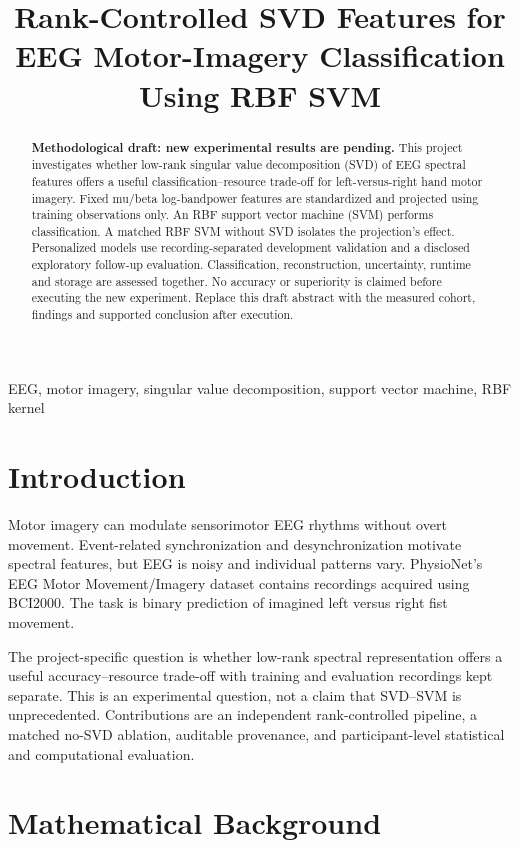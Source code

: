 \documentclass[conference]{IEEEtran}
\title{Rank-Controlled SVD Features for EEG Motor-Imagery Classification Using RBF SVM}
\author{\IEEEauthorblockN{[Student names and USNs]}
\IEEEauthorblockA{[Department and institution]\\Faculty: Dr Geetha KN\\{[Academic year]}}}
\begin{document}
\maketitle
\begin{abstract}
\textbf{Methodological draft: new experimental results are pending.}
This project investigates whether low-rank singular value decomposition (SVD) of
EEG spectral features offers a useful classification--resource trade-off for
left-versus-right hand motor imagery. Fixed mu/beta log-bandpower features are
standardized and projected using training observations only. An RBF support vector
machine (SVM) performs classification. A matched RBF SVM without SVD isolates the
projection's effect. Personalized models use recording-separated development
validation and a disclosed exploratory follow-up evaluation. Classification,
reconstruction, uncertainty, runtime and storage are assessed together. No accuracy
or superiority is claimed before executing the new experiment. Replace this draft
abstract with the measured cohort, findings and supported conclusion after execution.
\end{abstract}
\begin{IEEEkeywords}
EEG, motor imagery, singular value decomposition, support vector machine, RBF kernel
\end{IEEEkeywords}

\section{Introduction}
Motor imagery can modulate sensorimotor EEG rhythms without overt movement.
Event-related synchronization and desynchronization motivate spectral features,
but EEG is noisy and individual patterns vary\cite{ref3}. PhysioNet's EEG Motor
Movement/Imagery dataset contains recordings acquired using BCI2000\cite{ref1}.
The task is binary prediction of imagined left versus right fist movement.

The project-specific question is whether low-rank spectral representation offers
a useful accuracy--resource trade-off with training and evaluation recordings kept
separate. This is an experimental question, not a claim that SVD--SVM is unprecedented.
Contributions are an independent rank-controlled pipeline, a matched no-SVD ablation,
auditable provenance, and participant-level statistical and computational evaluation.

\section{Mathematical Background}
\end{document}
